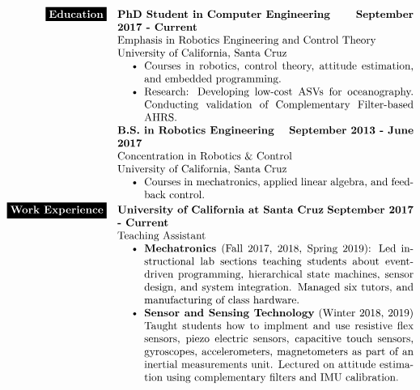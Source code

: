 \documentclass[paper=a4,fontsize=10pt]{article} %
\def \mainColWidth {0.8\textwidth}		%
\begin{document}
\begin{align*}
		\colorbox{black}{\color{white}{\textbf{Education}}}
		& &
		\parbox[t]{\mainColWidth}{%
			\textbf{PhD Student in Computer Engineering} \hfill \textbf{September 2017 - Current} \\
			Emphasis in Robotics Engineering and Control Theory\\
			University of California, Santa Cruz
			\begin{itemize}[noitemsep,topsep=0pt]
			\item Courses in robotics, control theory, attitude estimation, and embedded programming.
			\item Research: Developing low-cost ASVs for oceanography. Conducting validation of Complementary Filter-based AHRS.
			\end{itemize}
			\textbf{B.S. in Robotics Engineering} \hfill \textbf{September 2013 - June 2017}\\
			Concentration in Robotics \& Control\\
			University of California, Santa Cruz
			\begin{itemize}[noitemsep,topsep=0pt]
			\item Courses in mechatronics, applied linear algebra, and feedback control.
			\end{itemize}
		}%
	\\
		\colorbox{black}{\color{white}{\textbf{Work Experience}}}
		& &
		\parbox[t]{\mainColWidth}{%
			\textbf{University of California at Santa Cruz} \hfill \textbf{September 2017 - Current}\\
			\quad Teaching Assistant
			\begin{itemize}[noitemsep,topsep=0pt]
			\item \textbf{Mechatronics} (Fall 2017, 2018, Spring 2019): Led instructional lab sections teaching students about event-driven programming, hierarchical state machines, sensor design, and system integration. Managed six tutors, and manufacturing of class hardware.
			\item \textbf{Sensor and Sensing Technology} (Winter 2018, 2019) Taught students how to implment and use resistive flex sensors, piezo electric sensors, capacitive touch sensors, gyroscopes, accelerometers, magnetometers as part of an inertial measurements unit. Lectured on attitude estimation using complementary filters and IMU calibration.

\end{itemize}}
\end{align*}
\end{document}
